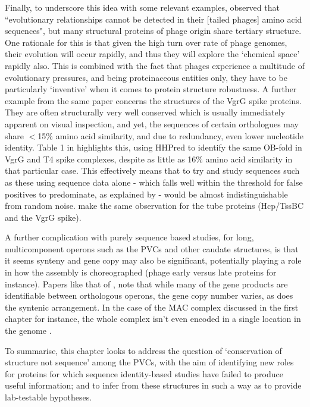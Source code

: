 Finally, to underscore this idea with some relevant examples, \cite{Leiman2010} observed that ``evolutionary relationships cannot be detected in their [tailed phages] amino acid sequences", but many structural proteins of phage origin share tertiary structure. One rationale for this is that given the high turn over rate of phage genomes, their evolution will occur rapidly, and thus they will explore the `chemical space' rapidly also. This is combined with the fact that phages experience a multitude of evolutionary pressures, and being proteinaceous entities only, they have to be particularly `inventive' when it comes to protein structure robustness. A further example from the same paper concerns the structures of the VgrG spike proteins. They are often structurally very well conserved which is usually immediately apparent on visual inspection, and yet, the sequences of certain orthologues may share $<$15\% amino acid similarity, and due to redundancy, even lower nucleotide identity. Table 1 in \cite{Browning2012} highlights this, using HHPred to identify the same OB-fold in VgrG and T4 spike complexes, despite as little as 16\% amino acid similarity in that particular case. This effectively means that to try and study sequences such as these using sequence data alone - which falls well within the threshold for false positives to predominate, as explained by \cite{rost1999twilight} - would be almost indistinguishable from random noise. \cite{Silverman2012} make the same observation for the tube proteins (Hcp/TssBC and the VgrG spike).

A further complication with purely sequence based studies, for long, multicomponent operons such as the PVCs and other caudate structures, is that it seems synteny and gene copy may also be significant, potentially playing a role in how the assembly is choreographed (phage early versus late proteins for instance). Papers like that of \cite{Sarris2014}, note that while many of the gene products are identifiable between orthologous operons, the gene copy number varies, as does the syntenic arrangement. In the case of the MAC complex discussed in the first chapter for instance, the whole complex isn't even encoded in a single location in the genome \citep{Shikuma2014}. 


To summarise, this chapter looks to address the question of `conservation of structure not sequence' among the PVCs, with the aim of identifying new roles for proteins for which sequence identity-based studies have failed to produce useful information; and to infer from these structures in such a way as to provide lab-testable hypotheses.

